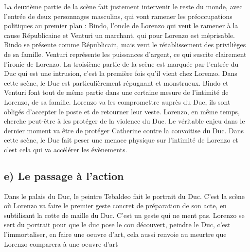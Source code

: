\documentclass[12pt]{article}
\begin{document}
La deuxième partie de la scène fait justement intervenir le reste du monde, avec l'entrée de deux personnages masculins, qui vont ramener les préoccupations politiques au premier plan : Bindo, l'oncle de Lorenzo qui veut le ramener à la cause Républicaine et Venturi un marchant, qui pour Lorenzo est méprisable.
Bindo se présente comme Républicain, mais veut le rétablissement des privilièges de sa famille.
Venturi représente les puissances d'argent, ce qui suscite clairement l'ironie de Lorenzo.
La troisième partie de la scène est marquée par l'entrée du Duc qui est une intrusion, c'est la première fois qu'il vient chez Lorenzo.
Dans cette scène, le Duc est particulièrement répugnant et monstrueux.
Bindo et Venturi font tout de même partie dans une certaine mesure de l'intimité de Lorenzo, de sa famille.
Lorenzo va les compromettre auprès du Duc, ils sont obligés d'accepter le poste et de retourner leur veste.
Lorenzo, en même temps, cherche peut-être à les protéger de la violence du Duc.
Le véritable enjeu dans le dernier moment va être de protéger Catherine contre la convoitise du Duc.
Dans cette scène, le Duc fait peser une menace physique sur l'intimité de Lorenzo et c'est cela qui va accélérer les évènements.
\subsection*{e) Le passage à l'action}
Dans le palais du Duc, le peintre Tebaldeo fait le portrait du Duc.
C'est la scène où Lorenzo va faire le premier geste concret de préparation de son acte, en subtilisant la cotte de maille du Duc.
C'est un geste qui ne ment pas.
Lorenzo se sert du portrait pour que le duc pose le cou découvert, peindre le Duc, c'est l'immortaliser, en faire une oeuvre d'art, cela aussi renvoie au meurtre que Lorenzo comparera à une oeuvre d'art
\end{document}
